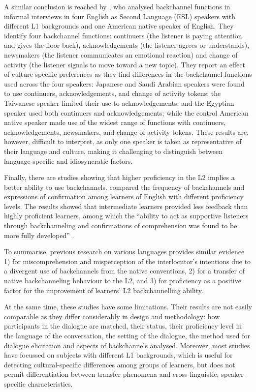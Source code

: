 A similar conclusion is reached by \citet{ShelleyGonzalez2013}, who analysed backchannel functions in informal interviews in four English as Second Language (ESL) speakers with different L1 backgrounds and one American native speaker of English. They identify four backchannel functions: continuers (the listener is paying attention and gives the floor back), acknowledgements (the listener agrees or understands), newsmakers (the listener communicates an emotional reaction) and change of activity (the listener signals to move toward a new topic). They report an effect of culture-specific preferences as they find differences in the backchannel functions used across the four speakers: Japanese and Saudi Arabian speakers were found to use continuers, acknowledgements, and change of activity tokens; the Taiwanese speaker limited their use to acknowledgements; and the Egyptian speaker used both continuers and acknowledgements; while the control American native speaker made use of the widest range of functions with continuers, acknowledgements, newsmakers, and change of activity tokens. These results are, however, difficult to interpret, as only one speaker is taken as representative of their language and culture, making it challenging to distinguish between language-specific and idiosyncratic factors.

Finally, there are studies showing that higher proficiency in the L2 implies a better ability to use backchannels. \citet{Galaczi2014} compared the frequency of backchannels and expressions of confirmation among learners of English with different proficiency levels. The results showed that intermediate learners provided less feedback than highly proficient learners, among which the “ability to act as supportive listeners through backchanneling and confirmations of comprehension was found to be more fully developed” \citep[570]{Galaczi2014}.

To summarise, previous research on various languages provides similar evidence 1) for miscomprehension and misperception of the interlocutor’s intentions due to a divergent use of backchannels from the native conventions, 2) for a transfer of native backchanneling behaviour to the L2, and 3) for proficiency as a positive factor for the improvement of learners’ L2 backchannelling ability.

At the same time, these studies have some limitations. Their results are not easily comparable as they differ considerably in design and methodology: how participants in the dialogue are matched, their status, their proficiency level in the language of the conversation, the setting of the dialogue, the method used for dialogue elicitation and aspects of backchannels analysed. Moreover, most studies have focussed on subjects with different L1 backgrounds, which is useful for detecting cultural-specific differences among groups of learners, but does not permit differentiation between transfer phenomena and cross-linguistic, speaker-specific characteristics.

